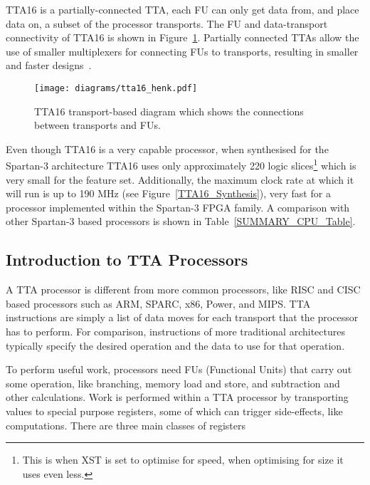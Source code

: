 TTA16 is a partially-connected TTA, each FU can only get data from, and place
data on, a subset of the processor transports. The FU and data-transport
connectivity of TTA16 is shown in Figure~\ref{TTA16_Tranport_View}. Partially
connected TTAs allow the use of smaller multiplexers for connecting FUs to
transports, resulting in smaller and faster designs~\cite{arnold1997dtr}.

\begin{figure}[h!]
\begin{center}
\texttt{[image: diagrams/tta16\_henk.pdf]}
\caption[TTA16 transports and functional units overview]{TTA16 transport-based
diagram which shows the connections between transports and FUs.}
\end{center}
\label{TTA16_Tranport_View}
\end{figure}

Even though TTA16 is a very capable processor, when synthesised for the Spartan-3
architecture TTA16 uses only approximately 220 logic slices\footnote{This is when
XST is set to optimise for speed, when optimising for size it uses even less.}
which is very small for the feature set. Additionally, the maximum clock rate at
which it will run is up to 190 MHz (see Figure~\ref{TTA16_Synthesis}), very fast
for a processor implemented within the Spartan-3 FPGA family. A comparison with
other Spartan-3 based processors is shown in Table~\ref{SUMMARY_CPU_Table}.


\subsection{Introduction to TTA Processors}
A TTA processor is different from more common processors, like RISC and CISC
based processors such as ARM, SPARC, x86, Power, and MIPS. TTA instructions are
simply a list of data moves for each transport that the processor has to perform.
For comparison, instructions of more traditional architectures typically specify
the desired operation and the data to use for that operation.

To perform useful work, processors need FUs (Functional Units) that carry out
some operation, like branching, memory load and store, and subtraction and other
calculations. Work is performed within a TTA processor by transporting values to
special purpose registers, some of which can trigger side-effects, like
computations. There are three main classes of registers

